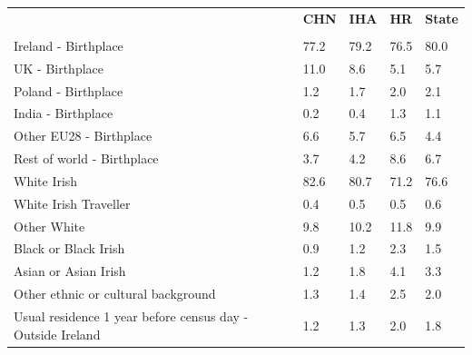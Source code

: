 \documentclass{article}
\begin{document}
\pagebreak
\begin{table}[h]	
\centering
		\begin{tabular}{KTTTT}
  \hline
& \textbf{CHN} & \textbf{IHA} & \textbf{HR}& \textbf{State}\\ 
  \hline
    \\ 
    \hline
Ireland - Birthplace & 77.2& 79.2& 76.5& 80.0\\
UK - Birthplace & 11.0&  8.6&  5.1&  5.7\\
Poland - Birthplace & 1.2& 1.7& 2.0& 2.1\\
India - Birthplace & 0.2& 0.4& 1.3& 1.1\\
Other EU28 - Birthplace & 6.6& 5.7& 6.5& 4.4\\
Rest of world - Birthplace & 3.7& 4.2& 8.6& 6.7\\
    \hline
White Irish & 82.6& 80.7& 71.2& 76.6\\
White Irish Traveller & 0.4& 0.5& 0.5& 0.6\\
Other White &  9.8& 10.2& 11.8&  9.9\\
Black or Black Irish & 0.9& 1.2& 2.3& 1.5\\
Asian or Asian Irish & 1.2& 1.8& 4.1& 3.3\\
Other ethnic or cultural background & 1.3& 1.4& 2.5& 2.0\\
    \hline
Usual residence 1 year before census day - Outside Ireland & 1.2& 1.3& 2.0& 1.8\\


\end{tabular}
\end{table}
\end{document}
